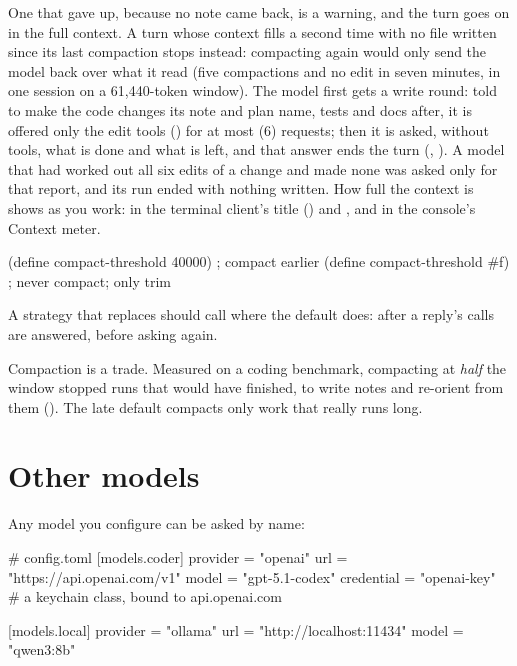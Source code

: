 One that gave up, because no note came back, is a warning, and the turn
goes on in the full context. A turn whose context fills a second time with
no file written since its last compaction stops instead: compacting again
would only send the model back over what it read (five compactions and no
edit in seven minutes, in one session on a 61,440-token window). The model
first gets a write round: told to make the code changes its note and plan
name, tests and docs after, it is offered only the edit tools
() for at most  (6)
requests; then it is asked, without tools, what is done and what is left,
and that answer ends the turn (,
). A model that had worked out all six edits of a
change and made none was asked only for that report, and its run ended
with nothing written. How full the context is shows as you work:
in the terminal client's title () and , and in the console's Context
meter.

\begin{scm}
(define compact-threshold 40000)   ; compact earlier
(define compact-threshold #f)      ; never compact; only trim
\end{scm}

A strategy that replaces  should call
 where the default does: after a
reply's calls are answered, before asking again.

\begin{careful}
Compaction is a trade. Measured on a coding benchmark, compacting at
\emph{half} the window stopped runs that would have finished, to write
notes and re-orient from them (). The late default compacts only
work that really runs long.
\end{careful}

\section{Other models}

Any model you configure can be asked by name:

\begin{toml}
# config.toml
[models.coder]
provider = "openai"
url = "https://api.openai.com/v1"
model = "gpt-5.1-codex"
credential = "openai-key"          # a keychain class, bound to api.openai.com

[models.local]
provider = "ollama"
url = "http://localhost:11434"
model = "qwen3:8b"
\end{toml}

